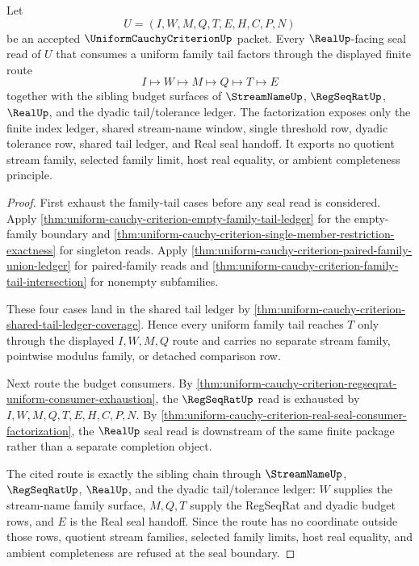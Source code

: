 \begin{theorem}
\label{thm:uniform-cauchy-criterion-budgeted-real-seal-factorization}
Let
$$
U=(I,W,M,Q,T,E,H,C,P,N)
$$
be an accepted $\UniformCauchyCriterionUp$ packet. Every $\RealUp$-facing seal read of $U$ that consumes a uniform family tail factors through the displayed finite route
$$
I \longmapsto W \longmapsto M \longmapsto Q \longmapsto T \longmapsto E
$$
together with the sibling budget surfaces of $\StreamNameUp$, $\RegSeqRatUp$, $\RealUp$, and the dyadic tail/tolerance ledger. The factorization exposes only the finite index ledger, shared stream-name window, single threshold row, dyadic tolerance row, shared tail ledger, and Real seal handoff. It exports no quotient stream family, selected family limit, host real equality, or ambient completeness principle.
\end{theorem}
\begin{proof}
First exhaust the family-tail cases before any seal read is considered. Apply \autoref{thm:uniform-cauchy-criterion-empty-family-tail-ledger} for the empty-family boundary and \autoref{thm:uniform-cauchy-criterion-single-member-restriction-exactness} for singleton reads. Apply \autoref{thm:uniform-cauchy-criterion-paired-family-union-ledger} for paired-family reads and \autoref{thm:uniform-cauchy-criterion-family-tail-intersection} for nonempty subfamilies.

These four cases land in the shared tail ledger by \autoref{thm:uniform-cauchy-criterion-shared-tail-ledger-coverage}. Hence every uniform family tail reaches $T$ only through the displayed $I,W,M,Q$ route and carries no separate stream family, pointwise modulus family, or detached comparison row.

Next route the budget consumers. By \autoref{thm:uniform-cauchy-criterion-regseqrat-uniform-consumer-exhaustion}, the $\RegSeqRatUp$ read is exhausted by $I,W,M,Q,T,E,H,C,P,N$. By \autoref{thm:uniform-cauchy-criterion-real-seal-consumer-factorization}, the $\RealUp$ seal read is downstream of the same finite package rather than a separate completion object.

The cited route is exactly the sibling chain through $\StreamNameUp$, $\RegSeqRatUp$, $\RealUp$, and the dyadic tail/tolerance ledger: $W$ supplies the stream-name family surface, $M,Q,T$ supply the RegSeqRat and dyadic budget rows, and $E$ is the Real seal handoff. Since the route has no coordinate outside those rows, quotient stream families, selected family limits, host real equality, and ambient completeness are refused at the seal boundary.
\end{proof}

